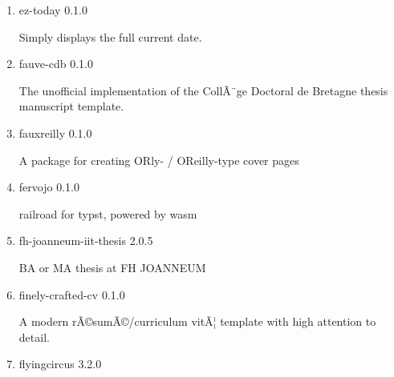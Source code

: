 \begin{enumerate}
  { exzellenz-tum-thesis } { 0.1.0 }

  Customizable template for a thesis at the TU Munich
\item
  \href{/universe/package/ez-today/}{}

  { ez-today } { 0.1.0 }

  Simply displays the full current date.
\item
  \href{/universe/package/fauve-cdb/}{}


  { fauve-cdb } { 0.1.0 }

  The unofficial implementation of the CollÃ¨ge Doctoral de Bretagne
  thesis manuscript template.
\item
  \href{/universe/package/fauxreilly/}{}

  { fauxreilly } { 0.1.0 }

  A package for creating O\textquotesingle Rly- /
  O\textquotesingle Reilly-type cover pages
\item
  \href{/universe/package/fervojo/}{}

  { fervojo } { 0.1.0 }

  railroad for typst, powered by wasm
\item
  \href{/universe/package/fh-joanneum-iit-thesis/}{}


  { fh-joanneum-iit-thesis } { 2.0.5 }

  BA or MA thesis at FH JOANNEUM

  { }
\item
  \href{/universe/package/finely-crafted-cv/}{}


  { finely-crafted-cv } { 0.1.0 }

  A modern rÃ©sumÃ©/curriculum vitÃ¦ template with high attention to
  detail.
\item
  \href{/universe/package/flyingcircus/}{}


  { flyingcircus } { 3.2.0 }


\end{enumerate}
